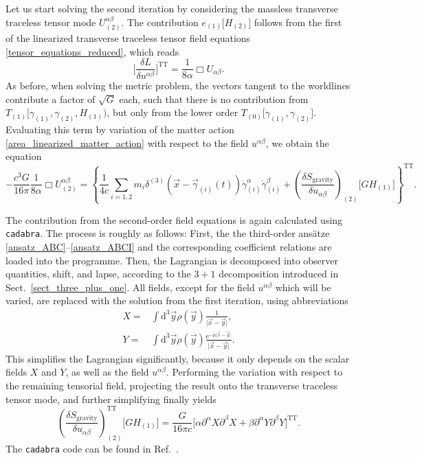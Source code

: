 Let us start solving the second iteration by considering the massless transverse traceless tensor mode $U^{\alpha\beta}_{(2)}$. The contribution $e_{(1)}\lbrack H_{(2)}\rbrack$ follows from the first of the linearized transverse traceless tensor field equations \eqref{tensor_equations_reduced}, which reads
\begin{equation}
  \bigg\lbrack\frac{\delta L}{\delta u^{\alpha\beta}}\bigg\rbrack^\text{TT} = \frac{1}{8\alpha} \Box U_{\alpha\beta}.
\end{equation}
As before, when solving the metric problem, the vectors tangent to the worldlines contribute a factor of $\sqrt{G}$ each, such that there is no contribution from $T_{(1)}\lbrack\gamma_{(1)},\gamma_{(2)},H_{(1)})$, but only from the lower order $T_{(0)}\lbrack\gamma_{(1)},\gamma_{(2)}\rbrack$. Evaluating this term by variation of the matter action \eqref{area_linearized_matter_action} with respect to the field $u^{\alpha\beta}$, we obtain the equation
\begin{equation}\label{area_massless_tt_equation}
  -\frac{c^3G}{16\pi} \frac{1}{8\alpha} \Box U^{\alpha\beta}_{(2)} = \left\{\frac{1}{4c}\sum_{i=1,2} m_i \delta^{(3)}(\vec x-\vec\gamma_{(i)}(t))\dot\gamma^\alpha_{(i)}\dot\gamma^\beta_{(i)} + \left(\frac{\delta S_\text{gravity}}{\delta u_{\alpha\beta}}\right)_{(2)}\lbrack GH_{(1)}\rbrack \right\}^\text{TT}.
\end{equation}

The contribution from the second-order field equations is again calculated using \texttt{cadabra}. The process is roughly as follows: First, the the third-order ansätze \eqref{ansatz_ABC}--\eqref{ansatz_ABCI} and the corresponding coefficient relations are loaded into the programme. Then, the Lagrangian is decomposed into observer quantities, shift, and lapse, according to the $3+1$ decomposition introduced in Sect.~\ref{sect_three_plus_one}. All fields, except for the field $u^{\alpha\beta}$ which will be varied, are replaced with the solution from the first iteration, using abbreviations
\begin{equation}
  \begin{aligned}
    X = &{} \int\mathrm d^3\vec y\rho(\vec y)\frac{1}{\lvert\vec x-\vec y\rvert}, \\
    Y = &{} \int\mathrm d^3\vec y\rho(\vec y)\frac{\mathrm e^{-\mu\lvert\vec x-\vec y\rvert}}{\lvert\vec x-\vec y\rvert}.
  \end{aligned}
\end{equation}
This simplifies the Lagrangian significantly, because it only depends on the scalar fields $X$ and $Y$, as well as the field $u^{\alpha\beta}$. Performing the variation with respect to the remaining tensorial field, projecting the result onto the transverse traceless tensor mode, and further simplifying finally yields
\begin{equation}
  \left(\frac{\delta S_\text{gravity}}{\delta u_{\alpha\beta}}\right)^\text{TT}_{(2)}\lbrack GH_{(1)}\rbrack = \frac{G}{16\pi c}\lbrack\alpha\partial^\alpha X\partial^\beta X + \beta\partial^\alpha Y\partial^\beta Y\rbrack^\text{TT}.
\end{equation}
The \texttt{cadabra} code can be found in Ref.\ \cite{Alex_2020_area-metric-gravity}.

